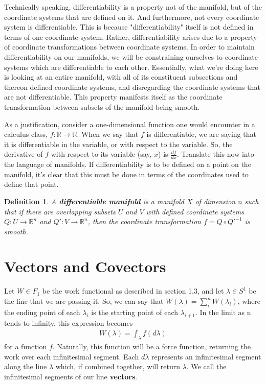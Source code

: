 \documentclass{book}
\newtheorem{defn}[equation]{Definition}
\begin{document}
Technically speaking, differentiability is a property not of the manifold, but of the coordinate systems that are defined on it. And furthermore, not every coordinate system is differentiable. This is because "differentiability" itself is not defined in terms of one coordinate system. Rather, differentiability arises due to a property of coordinate transformations between coordinate systems. In order to maintain differentiability on our manifolds, we will be constraining ourselves to coordinate systems which are differentiable to each other. Essentially, what we're doing here is looking at an entire manifold, with all of its constituent subsections and thereon defined coordinate systems, and disregarding the coordinate systems that are not differentiable. This property manifests itself as the coordinate transformation between subsets of the manifold being smooth. 

As a justification, consider a one-dimensional function one would encounter in a calculus class, $f: \mathbb{R} \to \mathbb{R}$. When we say that $f$ is differentiable, we are saying that it is differentiable in the variable, or with respect to the variable. So, the derivative of $f$ with respect to its variable (say, $x$) is $\frac{df}{dx}$. Translate this now into the language of manifolds. If differentiability is to be defined on a point on the manifold, it's clear that this must be done in terms of the coordinates used to define that point. 


\begin{defn}
	A \textbf{differentiable manifold} is a manifold $X$ of dimension $n$ such that if there are overlapping subsets $U$ and $V$ with defined coordinate systems $Q: U \to \mathbb{R}^n$ and $Q': V \to \mathbb{R}^n$, then the coordinate transformation $f = Q \circ Q'^{-1}$ is smooth. 
\end{defn}







\section{Vectors and Covectors}



Let $W \in F_1$ be the work functional as described in section 1.3, and let $\lambda \in S^1$ be the line that we are passing it. So, we can say that $W(\lambda) = \sum^n_iW(\lambda_i)$, where the ending point of each $\lambda_i$ is the starting point of each $\lambda_{i+1}$. In the limit as n tends to infinity, this expression becomes \begin{gather}W(\lambda) = \int_{\lambda} f(d\lambda) \end{gather}for a function $f$. Naturally, this function will be a force function, returning the work over each infinitesimal segment. Each $d\lambda$ represents an infinitesimal segment along the line $\lambda$ which, if combined together, will return $\lambda$. We call the infinitesimal segments of our line \textbf{vectors}. 
\end{document}
